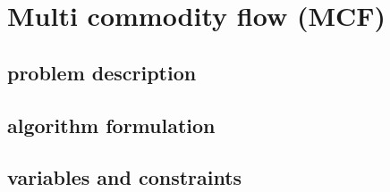 \section{Multi commodity flow (MCF)}

\subsection{problem description}

\subsection{algorithm formulation}

\subsection{variables and constraints}
